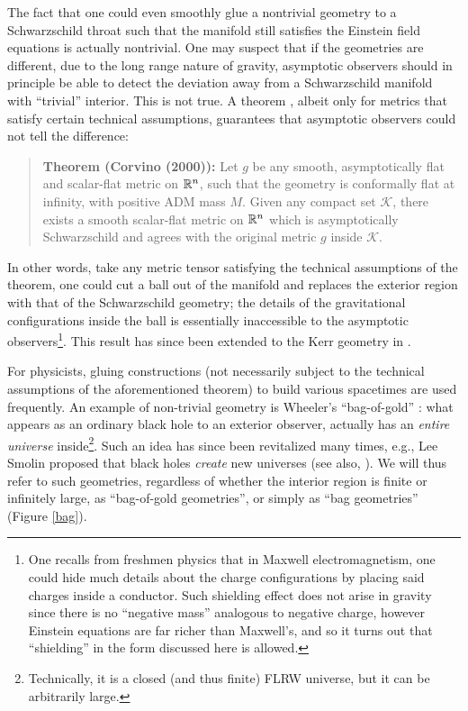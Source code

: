 \documentclass[12pt]{article}
\newcommand{\2}{$^2$}
\newcommand{\3}{$^3$}
\newcommand{\4}{$_4$}
\newcommand{\5}{$_5$}
\begin{document}
The fact that one could even smoothly glue a nontrivial geometry to a Schwarzschild throat such that the manifold still satisfies the Einstein field equations is actually nontrivial. 
One may suspect that if the geometries are different, due to the long range nature of gravity, asymptotic observers should in principle be able to detect the deviation away from a Schwarzschild manifold with ``trivial'' interior. This is not true. 
A theorem \cite{corvino}, albeit only for metrics that satisfy certain technical assumptions, guarantees that asymptotic observers could not tell the difference:
\begin{quote}
\textbf{Theorem (Corvino (2000)):} Let $g$ be any smooth, asymptotically flat and scalar-flat metric on $\Bbb{R}^n$, such that the geometry is conformally flat at infinity, with positive ADM mass $M$. Given any compact set $\mathcal{K}$, there exists a smooth scalar-flat metric on $\Bbb{R}^n$ which is asymptotically Schwarzschild and agrees with the original metric $g$ inside $\mathcal{K}$. 
\end{quote}
In other words, take any metric tensor satisfying the technical assumptions of the theorem, one could cut a ball out of the manifold and replaces the exterior region with that of the Schwarzschild geometry;
the details of the gravitational configurations inside the ball is essentially inaccessible to the asymptotic observers\footnote{One recalls from freshmen physics that in Maxwell electromagnetism, one could hide much details about the charge configurations by placing said charges inside a conductor. Such shielding effect does not arise in gravity since there is no ``negative mass'' analogous to negative charge, however Einstein equations are far richer than Maxwell's, and so it turns out that ``shielding'' in the form discussed here is allowed. }. This result has since been extended to the Kerr geometry in \cite{corvino2}. 

For physicists, gluing constructions (not necessarily subject to the technical assumptions of the aforementioned theorem) to build various spacetimes are used frequently.
An example of non-trivial geometry is Wheeler's ``bag-of-gold'' \cite{bagofgold}: what appears as an ordinary black hole to an exterior observer, actually has an \emph{entire universe} inside\footnote{Technically, it is a closed (and thus finite) FLRW universe, but it can be arbitrarily large.}. Such an idea has since been revitalized many times, e.g., Lee Smolin proposed that black holes \emph{create} new universes \cite{smolin1, smolin2} (see also, \cite{Frolov:1988vj, FMM1, 9511136}). We will thus refer to such geometries, regardless of whether the interior region is finite or infinitely large, as ``bag-of-gold geometries'', or simply as ``bag geometries'' (Figure \ref{bag}).
\end{document}
